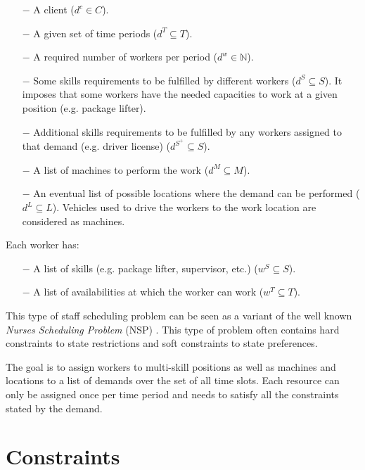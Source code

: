\documentclass[../thesis.tex]{subfiles}
\begin{document}
\begin{itemize}
  \item[$-$] A client ($d^c \in C$).
  \item[$-$] A given set of time periods ($d^T \subseteq T$).
  \item[$-$] A required number of workers per period ($d^w \in \mathbb{N}$).
  \item[$-$] Some skills requirements to be fulfilled by different workers ($d^S \subseteq S$).
  It imposes that some workers have the needed capacities to work at a given position (e.g. package lifter).
  \item[$-$] Additional skills requirements to be fulfilled by any workers assigned to that demand (e.g. driver license) ($d^{S^{+}} \subseteq S$).
  \item[$-$] A list of machines to perform the work ($d^M \subseteq M$).
  \item[$-$] An eventual list of possible locations where the demand can be performed ($d^L \subseteq L$). 
  Vehicles used to drive the workers to the work location are considered as machines.
\end{itemize}


Each worker has:

\begin{itemize}
  \item[$-$] A list of skills (e.g. package lifter, supervisor, etc.) ($w^S \subseteq S$).
  \item[$-$] A list of availabilities at which the worker can work ($w^T \subseteq T$).  
\end{itemize}


This type of staff scheduling problem can be seen as a variant of the 
well known \emph{Nurses Scheduling Problem} (NSP) \cite{Burke2004}. 
This type of problem often contains hard constraints to state restrictions 
and soft constraints to state preferences. 




The goal is to assign workers to multi-skill positions as well as machines and locations to a list of demands over the set of all time slots.
Each resource can only be assigned once per time period and needs to satisfy all the constraints stated by the demand. 

\section{Constraints}
\end{document}

